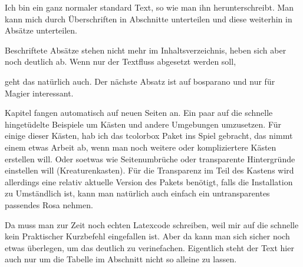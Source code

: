\documentclass{Ilaris}
\begin{document}
\anfang
{}
\inhaltsverzeichnis
\neueseite
\hauptteil
{}
\platz
{}
\lizenz
{}
\spaltenanfang
{}


Ich bin ein ganz normaler standard Text, so wie man ihn herunterschreibt. Man kann mich durch Überschriften in Abschnitte unterteilen und diese weiterhin in Absätze unterteilen.

Beschriftete Absätze stehen nicht mehr im Inhaltsverzeichnis, heben sich aber noch deutlich ab. Wenn nur der Textfluss abgesetzt werden soll,

geht das natürlich auch. Der nächste Absatz ist auf bosparano und nur für Magier interessant.

\lipsum[1-4]

Kapitel fangen automatisch auf neuen Seiten an.
Ein paar auf die schnelle hingetüdelte Beispiele um Kästen und andere Umgebungen umzusetzen. Für einige dieser Kästen, hab ich das tcolorbox Paket ins Spiel gebracht, das nimmt einem etwas Arbeit ab, wenn man noch weitere oder kompliziertere Kästen erstellen will. Oder soetwas wie Seitenumbrüche oder transparente Hintergründe einstellen will (Kreaturenkasten). Für die Transparenz im Teil des Kastens wird allerdings eine relativ aktuelle Version des Pakets benötigt, falls die Installation zu Umständlich ist, kann man natürlich auch einfach ein untransparentes passendes Rosa nehmen.

Da muss man zur Zeit noch echten Latexcode schreiben, weil mir auf die schnelle kein Praktischer Kurzbefehl eingefallen ist. Aber da kann man sich sicher noch etwas überlegen, um das deutlich zu verinefachen. Eigentlich steht der Text hier auch nur um die Tabelle im Abschnitt nicht so alleine zu lassen.
\end{document}
